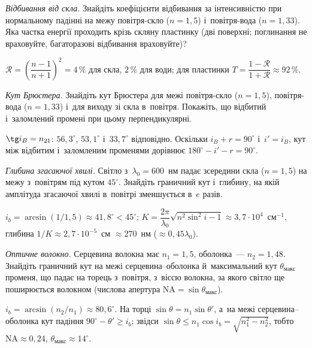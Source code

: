 \begin{problem}\label{prb:NormalReflectance}
	\emph{Відбивання від скла.} Знайдіть коефіцієнти відбивання за інтенсивністю при нормальному падінні на межу повітря-скло ($n=1{,}5$) і~повітря-вода ($n=1{,}33$). Яка частка енергії проходить крізь скляну пластинку (дві поверхні; поглинання не враховуйте, багаторазові відбивання враховуйте)?
	\begin{solution}
		$\mathcal R=\left(\dfrac{n-1}{n+1}\right)^2=4\,\%$ для скла, $2\,\%$ для води; для пластинки $T=\dfrac{1-\mathcal R}{1+\mathcal R}\approx92\,\%$.
	\end{solution}
\end{problem}

\begin{problem}\label{prb:BrewsterAngles}
	\emph{Кут Брюстера.} Знайдіть кут Брюстера для межі повітря-скло ($n=1{,}5$), повітря-вода ($n=1{,}33$) і~для виходу зі скла в~повітря. Покажіть, що відбитий і~заломлений промені при цьому перпендикулярні.
	\begin{solution}
		$\tg i_B=n_{21}$: $56{,}3^\circ$, $53{,}1^\circ$ і~$33{,}7^\circ$ відповідно. Оскільки $i_B+r=90^\circ$ і~$i'=i_B$, кут між відбитим і~заломленим променями дорівнює $180^\circ-i'-r=90^\circ$.
	\end{solution}
\end{problem}

\begin{problem}\label{prb:EvanescentDepth}
	\emph{Глибина згасаючої хвилі.} Світло з~$\lambda_0=600$~нм падає зсередини скла ($n=1{,}5$) на межу з~повітрям під кутом $45^\circ$. Знайдіть граничний кут і~глибину, на якій амплітуда згасаючої хвилі в~повітрі зменшується в~$e$ разів.
	\begin{solution}
		$i_b=\arcsin(1/1{,}5)\approx41{,}8^\circ<45^\circ$; $K=\dfrac{2\pi}{\lambda_0}\sqrt{n^2\sin^2i-1}\approx3{,}7\cdot10^{4}$~см$^{-1}$, глибина $1/K\approx2{,}7\cdot10^{-5}$~см $\approx270$~нм ($\approx0{,}45\lambda_0$).
	\end{solution}
\end{problem}

\begin{problem}\label{prb:OpticalFiber}
	\emph{Оптичне волокно.} Серцевина волокна має $n_1=1{,}5$, оболонка~--- $n_2=1{,}48$. Знайдіть граничний кут на межі серцевина--оболонка й~максимальний кут $\theta_\text{макс}$ променя, що падає на торець з~повітря, з~віссю волокна, за якого світло ще поширюється волокном (числова апертура $\mathrm{NA}=\sin\theta_\text{макс}$).
	\begin{solution}
		$i_b=\arcsin(n_2/n_1)\approx80{,}6^\circ$. На торці $\sin\theta=n_1\sin\theta'$, а~на межі серцевина--оболонка кут падіння $90^\circ-\theta'\geqslant i_b$; звідси $\sin\theta\leqslant n_1\cos i_b=\sqrt{n_1^2-n_2^2}$, тобто $\mathrm{NA}\approx0{,}24$, $\theta_\text{макс}\approx14^\circ$.
	\end{solution}
\end{problem}

